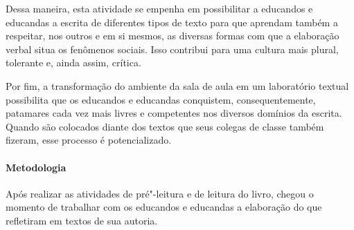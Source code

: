 \documentclass[12pt]{extarticle}
\begin{document}
Dessa maneira, esta atividade se empenha em possibilitar a educandos e
educandas a escrita de diferentes tipos de texto para que aprendam
também a respeitar, nos outros e em si mesmos, as diversas formas com
que a elaboração verbal situa os fenômenos sociais. Isso contribui para
uma cultura mais plural, tolerante e, ainda assim, crítica.

Por fim, a transformação do ambiente da sala de aula em um laboratório
textual possibilita que os educandos e educandas conquistem,
consequentemente, patamares cada vez mais livres e competentes nos
diversos domínios da escrita. Quando são colocados diante dos textos que
seus colegas de classe também fizeram, esse processo é potencializado.


\paragraph{Metodologia}

Após realizar as atividades de pré"-leitura e de leitura do livro, chegou
o momento de trabalhar com os educandos e educandas a elaboração do que
refletiram em textos de sua autoria.
\end{document}
